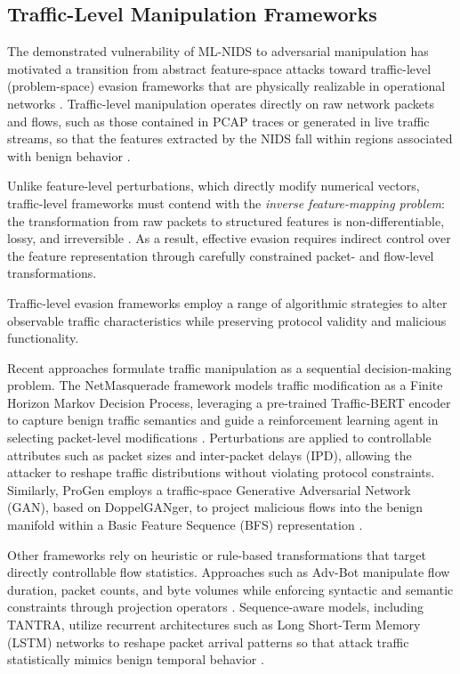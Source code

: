 \subsection{Traffic-Level Manipulation Frameworks}

The demonstrated vulnerability of ML-NIDS to adversarial manipulation has motivated a transition from abstract feature-space attacks toward traffic-level (problem-space) evasion frameworks that are physically realizable in operational networks \cite{vitorino2023sok}. 
Traffic-level manipulation operates directly on raw network packets and flows, such as those contained in PCAP traces or generated in live traffic streams, so that the features extracted by the NIDS fall within regions associated with benign behavior \cite{liu2025hard}. 

Unlike feature-level perturbations, which directly modify numerical vectors, traffic-level frameworks must contend with the \emph{inverse feature-mapping problem}: the transformation from raw packets to structured features is non-differentiable, lossy, and irreversible \cite{debicha2023adv}. 
As a result, effective evasion requires indirect control over the feature representation through carefully constrained packet- and flow-level transformations.

Traffic-level evasion frameworks employ a range of algorithmic strategies to alter observable traffic characteristics while preserving protocol validity and malicious functionality.

Recent approaches formulate traffic manipulation as a sequential decision-making problem. 
The NetMasquerade framework models traffic modification as a Finite Horizon Markov Decision Process, leveraging a pre-trained Traffic-BERT encoder to capture benign traffic semantics and guide a reinforcement learning agent in selecting packet-level modifications \cite{liu2025hard}. 
Perturbations are applied to controllable attributes such as packet sizes and inter-packet delays (IPD), allowing the attacker to reshape traffic distributions without violating protocol constraints. 
Similarly, ProGen employs a traffic-space Generative Adversarial Network (GAN), based on DoppelGANger, to project malicious flows into the benign manifold within a Basic Feature Sequence (BFS) representation \cite{wang2024progen}.

Other frameworks rely on heuristic or rule-based transformations that target directly controllable flow statistics. 
Approaches such as Adv-Bot manipulate flow duration, packet counts, and byte volumes while enforcing syntactic and semantic constraints through projection operators \cite{debicha2023adv}. 
Sequence-aware models, including TANTRA, utilize recurrent architectures such as Long Short-Term Memory (LSTM) networks to reshape packet arrival patterns so that attack traffic statistically mimics benign temporal behavior \cite{han2021evaluating}.


